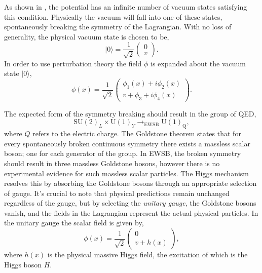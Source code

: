 As shown in , the potential has an infinite number of vacuum states satisfying this condition.
Physically the vacuum will fall into one of these states, spontaneously breaking the symmetry of the Lagrangian.
With no loss of generality, the physical vacuum state is chosen to be,
\begin{equation}
	\label{eq:higgs_vacuum}
	| 0 \rangle	= \frac{1}{\sqrt{2}} \begin{pmatrix} 0 \\ v \end{pmatrix}.
\end{equation}
In order to use perturbation theory the field $\phi$ is expanded about the vacuum state $|0\rangle$,
\begin{equation}
	\phi(x) = \frac{1}{\sqrt{2}} \begin{pmatrix} \phi_1(x) + i \phi_2(x) \\ v + \phi_3 + i \phi_4(x) \end{pmatrix}.
\end{equation}

The expected form of the symmetry breaking should result in the group of QED,
\begin{equation}
	\text{SU}(2)_L \times \text{U}(1)_Y \rightarrow_\text{EWSB} \text{U}(1)_\text{Q},
\end{equation}
where $Q$ refers to the electric charge.
The Goldstone theorem states that for every spontaneously broken continuous symmetry there exists a massless scalar boson; one for each generator of the group.
In EWSB, the broken symmetry should result in three massless Goldstone bosons, however there is no experimental evidence for such massless scalar particles.
The Higgs mechanism resolves this by absorbing the Goldstone bosons through an appropriate selection of gauge.
It's crucial to note that physical predictions remain unchanged regardless of the gauge, but by selecting the \textit{unitary gauge}, the Goldstone bosons vanish, and the fields in the Lagrangian represent the actual physical particles.
In the unitary gauge the scalar field is given by,
\begin{equation}
	\label{eq:higgs_unitary_gauge}
	\phi(x) = \frac{1}{\sqrt{2}} \begin{pmatrix} 0 \\ v + h(x) \end{pmatrix},
\end{equation}
where $h(x)$ is the physical massive Higgs field, the excitation of which is the Higgs boson $H$.

